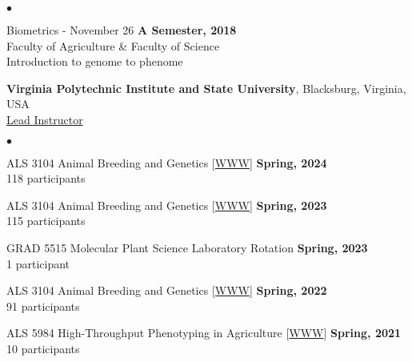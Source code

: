 \documentclass[margin,line,10pt]{res}
\newenvironment{list2}{
  \begin{list}{$\bullet$}{%
      \setlength{\itemsep}{0in}
      \setlength{\parsep}{0in} \setlength{\parskip}{0in}
      \setlength{\topsep}{0in} \setlength{\partopsep}{0in} 
      \setlength{\leftmargin}{0.2in}}}{\end{list}}
\begin{document}
\begin{resume}
\vspace{0.4cm}
 \begin{list2}
 \item Biometrics  - November 26 \hfill {\bf A Semester, 2018} \\
 Faculty of Agriculture \& Faculty of Science \\
 Introduction to genome to phenome
 \end{list2}


 \vspace{1cm}



{\bf Virginia Polytechnic Institute and State University}, Blacksburg, Virginia, USA  \vspace{0.2cm} \\
\underline{Lead Instructor}
\vspace{0.4cm}
\begin{list2}


  \item ALS 3104 Animal Breeding and Genetics [\textcolor{blue}{\href{http://morotalab.org/als3104-2022/ALS3104.html}{WWW}}] 
  \hfill {\bf Spring, 2024} \\
         118  participants 
  
         \vspace{0.5cm}


  \item ALS 3104 Animal Breeding and Genetics [\textcolor{blue}{\href{http://morotalab.org/als3104-2022/ALS3104.html}{WWW}}] 
  \hfill {\bf Spring, 2023} \\
         115  participants 
  
         \vspace{0.5cm}

  \item GRAD 5515 Molecular Plant Science Laboratory Rotation
  \hfill {\bf Spring, 2023} \\
  1 participant

  \vspace{0.5cm}

   \item ALS 3104 Animal Breeding and Genetics [\textcolor{blue}{\href{http://morotalab.org/als3104-2022/ALS3104.html}{WWW}}] 
  \hfill {\bf Spring, 2022} \\
         91  participants 
  
         \vspace{0.5cm}
         

  \item ALS 5984 High-Throughput Phenotyping in Agriculture [\textcolor{blue}{\href{http://morotalab.org/als5984-2021/ALS5984.html}{WWW}}] 
  \hfill {\bf Spring, 2021} \\
         10  participants 
  

\end{list2}
\end{resume}
\end{document}
